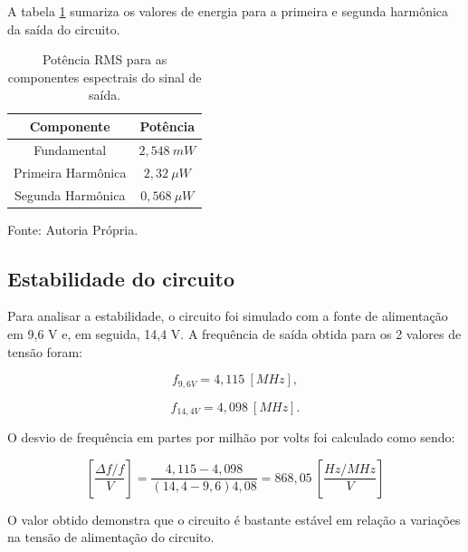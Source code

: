 A tabela \ref{tab:distor} sumariza os valores de energia para a primeira e segunda harmônica da saída do circuito.

\begin{table}[H]
    \begin{center}
        \caption{Potência RMS para as componentes espectrais do sinal de saída.}\label{tab:distor}
        \begin{tabular}{cc}
            \hline
            Componente & Potência \\
            \hline
            Fundamental & $2,548 \ mW$ \\
            Primeira Harmônica & $2,32 \  \mu W$ \\
            Segunda Harmônica & $0,568 \ \mu W$\\
            \hline
        \end{tabular}
        
        \small Fonte: Autoria Própria.
    \end{center}
\end{table}

\subsection{Estabilidade do circuito}

Para analisar a estabilidade, o circuito foi simulado com a fonte de alimentação em 9,6 V e, em seguida, 14,4 V. A frequência de saída obtida para os 2 valores de tensão foram:

\[
    f_{9,6V} = 4,115 \ [MHz],
\]

\[
    f_{14,4V} = 4,098 \ [MHz].
\]

O desvio de frequência em partes por milhão por volts foi calculado como sendo:

\[
    \left[\frac{\Delta f / f}{V}\right] = \frac{4,115 - 4,098}{(14,4-9,6)4,08} = 868,05 \ \left[\frac{Hz/MHz}{V}\right]
\]

O valor obtido demonstra que o circuito é bastante estável em relação a variações na tensão de alimentação do circuito.